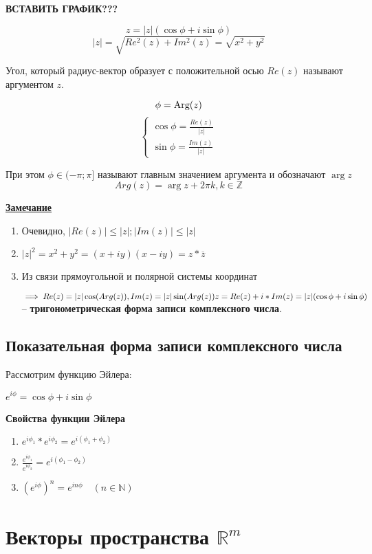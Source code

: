 \documentclass{article}
\begin{document}
\textbf{ВСТАВИТЬ ГРАФИК???}

\[z = |z|(\cos \phi + i \sin \phi)\]
\[|z| = \sqrt{Re^2(z) + Im^2(z)} = \sqrt{x^2 + y^2}\]

Угол, который радиус-вектор образует с положительной осью $Re(z)$
называют аргументом $z$.

\[\phi = \textnormal{Arg}(z)\]
\[
    \begin{cases}
        \cos \phi = \frac{Re(z)}{|z|} \\
        \sin \phi = \frac{Im(z)}{|z|}
    \end{cases}
\]

При этом $\phi \in (-\pi; \pi]$ называют главным значением аргумента и обозначают $\arg z$
\[Arg(z) = \arg z + 2 \pi k, k \in \mathbb{Z}\]

\underline{\textbf{Замечание}}

\begin{enumerate}
    \item Очевидно, $|Re(z)| \le |z|; |Im(z)| \le |z|$
    \item $|z|^2 = x^2 + y^2 = (x + iy)(x - iy) = z * \overline{z}$
    \item Из связи прямоугольной и полярной системы координат 
    
    $\implies Re(z) = |z| \cos (Arg(z)), Im(z) = |z| \sin (Arg(z)) \\
    z = Re(z) + i*Im(z) = |z|(\cos \phi + i \sin \phi)$ -- \textbf{тригонометрическая
    форма записи комплексного числа}.
\end{enumerate}

\subsection{Показательная форма записи комплексного числа}

Рассмотрим функцию Эйлера:

$e^{i \phi} = \cos \phi + i \sin \phi$

\textbf{Свойства функции Эйлера}

\begin{enumerate}
    \item $e^{i \phi_1} * e^{i \phi_2} = e^{i(\phi_1 + \phi_2)}$
    \item $\frac{e^{i \phi_1}}{e^{i \phi_2}} = e^{i(\phi_1 - \phi_2)}$
    \item $(e^{i \phi})^n = e^{i n \phi} \quad (n \in \mathbb{N})$
\end{enumerate}

\section{Векторы пространства $\mathbb{R}^m$}
\end{document}
